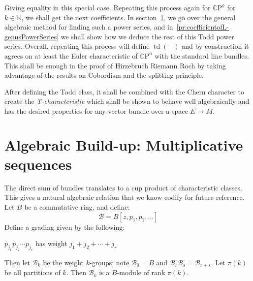 \documentclass{ut-thesis}
\newcommand{\N}{{\mathbb{N}}}
\newcommand{\Z}{{\mathbb{Z}}}
\newcommand{\CB}{{\mathcal{B}}}
\newcommand{\cp}{{\mathpzc{p}}}
\newcommand{\CP}{{\mathbb{C}\mathrm{P}}}
\newcommand{\td}{{\operatorname{td}}}
\begin{document}
Giving equality in this special case. Repeating this process again for $\CP^k$ for $k \in \N$, we shall get
the next coefficients. In section~\ref{sec:mSequence}, we go over the general algebraic method for finding
such a power series, and in~\cref{pr:coefficientofL-genusPowerSeries} we shall show how we deduce the rest of
this Todd power series. Overall, repeating this process will define $\td(-)$ and by construction it agrees on
at least the Euler characteristic of $\CP^n$ with the standard line bundles. This shall be enough in the
proof of Hirzebruch Riemann Roch by taking advantage of the results on Cobordism and the splitting principle.

After defining the Todd class, it shall be combined with the Chern character to create the
\emph{T-characteristic} which shall be shown to behave well algebraically and has the desired properties for
any vector bundle over a space $E \to M$.


%

\section{Algebraic Build-up: Multiplicative sequences}\label{sec:mSequence}

The direct sum of bundles translates to a cup product of
characteristic classes. This gives a natural algebraic relation that we know codify for future reference. Let
$B$ be a commutative ring, and define:
\[
  \CB = B[z, p_1, p_2, ...]
\]
Define a grading given by the following:
\begin{center}
  $p_{j_1}p_{j_2}\cdots p_{j_r}$ has weight $j_1 + j_2 + \cdots + j_r$
\end{center}
Then let $\CB_k$ be the weight $k$-groups; note $\CB_0 = B$ and $\CB_r\CB_s = \CB_{r+s}$. Let $\pi(k)$ be all
partitions of $k$. Then $\CB_k$ is a $B$-module of rank $\pi(k)$.
\end{document}
